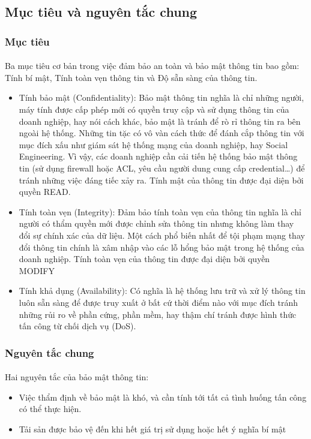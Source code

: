 \subsection{Mục tiêu và nguyên tắc chung}

\subsubsection{Mục tiêu}

\paragraph{}
Ba mục tiêu cơ bản trong việc đảm bảo an toàn và bảo mật thông tin bao gồm: Tính bí mật, Tính toàn vẹn thông tin và Độ sẵn sàng của thông tin.
\begin{itemize}
	\item Tính bảo mật (Confidentiality): Bảo mật thông tin nghĩa là chỉ những người, máy tính được cấp phép mới có quyền truy cập và sử dụng thông tin của doanh nghiệp, hay nói cách khác, bảo mật là tránh để rò rỉ thông tin ra bên ngoài hệ thống. Những tin tặc có vô vàn cách thức để đánh cắp thông tin với mục đích xấu như giám sát hệ thống mạng của doanh nghiệp, hay Social Engineering. Vì vậy, các doanh nghiệp cần cải tiến hệ thống bảo mật thông tin (sử dụng firewall hoặc ACL, yêu cầu người dung cung cấp credential…) để tránh những việc đáng tiếc xảy ra. Tính mật của thông tin được đại diện bởi quyền READ.
	\item Tính toàn vẹn (Integrity): Đảm bảo tính toàn vẹn của thông tin nghĩa là chỉ người có thẩm quyền mới được chỉnh sửa thông tin nhưng không làm thay đổi sự chính xác của dữ liệu. Một cách phổ biến nhất để tội phạm mạng thay đổi thông tin chính là xâm nhập vào các lỗ hổng bảo mật trong hệ thống của doanh nghiệp. Tính toàn vẹn của thông tin được đại diện bởi quyền MODIFY
	\item Tính khả dụng (Availability): Có nghĩa là hệ thống lưu trữ và xử lý thông tin luôn sẵn sàng để được truy xuất ở bất cứ thời điểm nào với mục đích tránh những rủi ro về phần cứng, phần mềm, hay thậm chí tránh được hình thức tấn công từ chối dịch vụ (DoS).
	
\end{itemize}

\subsubsection{Nguyên tắc chung}

\paragraph{}
Hai nguyên tắc của bảo mật thông tin:
\begin{itemize}
	\item Việc thẩm định về bảo mật là khó, và cần tính tới tất cả tình huống tấn công có thể thực hiện.
	\item Tải sản được bảo vệ đến khi hết giá trị sử dụng hoặc hết ý nghĩa bí mật
\end{itemize}

